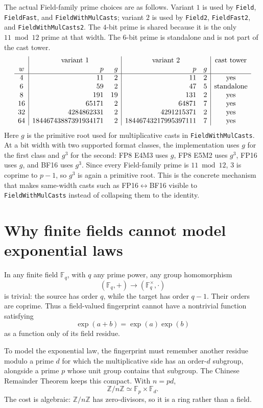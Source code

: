 \documentclass[11pt]{article}
\newcommand{\Z}{\mathbb{Z}}
\newcommand{\F}{\mathbb{F}}
\newcommand{\FieldFast}{\texttt{FieldFast}}
\newcommand{\FieldMC}{\texttt{FieldWith\allowbreak{}Mul\allowbreak{}Casts}}
\theoremstyle{plain}
\begin{document}
The actual Field-family prime choices are as follows.  Variant \(1\) is used by
\texttt{Field}, \FieldFast{}, and \FieldMC{}; variant \(2\) is used by
\texttt{Field2}, \texttt{FieldFast2}, and \texttt{FieldWithMulCasts2}.  The
\(4\)-bit prime is shared because it is the only \(11\bmod 12\) prime at that
width.  The \(6\)-bit prime is standalone and is not part of the cast tower.
\[
\begin{array}{c|r@{\quad}r|r@{\quad}r|c}
  & \multicolumn{2}{c|}{\text{variant 1}}
  & \multicolumn{2}{c|}{\text{variant 2}}
  & \text{cast tower}\\
w & p & g & p & g & \\
\hline
4  & 11 & 2  & 11 & 2 & \text{yes}\\
6  & 59 & 2  & 47 & 5 & \text{standalone}\\
8  & 191 & 19 & 131 & 2 & \text{yes}\\
16 & 65171 & 2 & 64871 & 7 & \text{yes}\\
32 & 4284862331 & 2 & 4291215371 & 2 & \text{yes}\\
64 & 18446743887391934171 & 2 & 18446743217995397111 & 7 & \text{yes}
\end{array}
\]
Here \(g\) is the primitive root used for multiplicative casts in
\FieldMC{}.  At a bit width with two supported format classes, the
implementation uses \(g\) for the first class and \(g^3\) for the second:
FP8 E4M3 uses \(g\), FP8 E5M2 uses \(g^3\), FP16 uses \(g\), and
BF16 uses \(g^3\).  Since every Field-family prime is \(11\bmod 12\), \(3\) is
coprime to \(p-1\), so \(g^3\) is again a primitive root.  This is the concrete
mechanism that makes same-width casts such as FP16\(\leftrightarrow\)BF16
visible to \FieldMC{} instead of collapsing them to the identity.

\section{Why finite fields cannot model exponential laws}

In any finite field \(\F_q\), with \(q\) any prime power, any group homomorphism
\[
  (\F_q,+)\longrightarrow(\F_q^\times,\cdot)
\]
is trivial: the source has order \(q\), while the target has order \(q-1\).
Their orders are coprime.  Thus a field-valued fingerprint cannot have a
nontrivial function satisfying
\[
  \exp(a+b)=\exp(a)\exp(b)
\]
as a function only of its field residue.

To model the exponential law, the fingerprint must remember another residue
modulo a prime \(d\) for which the multiplicative side has an order-\(d\)
subgroup, alongside a prime \(p\) whose unit group contains that subgroup.  The
Chinese Remainder Theorem keeps this compact.  With \(n=pd\),
\[
  \Z/n\Z \simeq \F_p\times \F_d.
\]
The cost is algebraic: \(\Z/n\Z\) has zero-divisors, so it is a ring rather than
a field.
\end{document}
